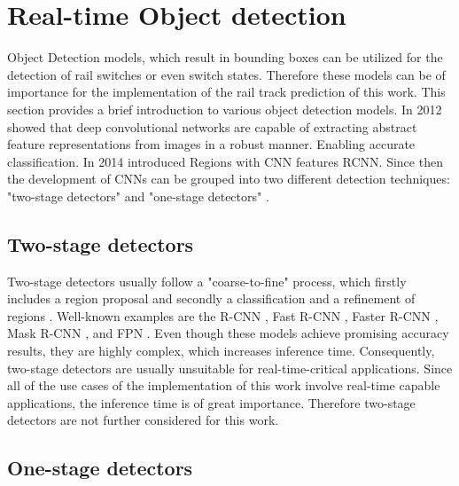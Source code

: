 \section{Real-time Object detection}
\label{sec:ObjectDetection}

Object Detection models, which result in bounding boxes can be utilized for the detection of rail switches or even switch states.
Therefore these models can be of importance for the implementation of the rail track prediction of this work.
This section provides a brief introduction to various object detection models.
In 2012 \cite{ImageNetClassification2012} showed that deep convolutional networks are capable of extracting abstract feature representations from images in a robust manner.
Enabling accurate classification.
In 2014 \cite{RCNN2014} introduced Regions with CNN features \ac{RCNN}.
Since then the development of CNNs can be grouped into two different detection techniques: "two-stage detectors" and "one-stage detectors" \cite{20yearsSurvey} \cite{surveyObjectDetection} \cite{surveyObjectDetection2019}.

\subsection{Two-stage detectors}

Two-stage detectors usually follow a "coarse-to-fine" process, which firstly includes a region proposal and secondly a classification and a refinement of regions \cite{20yearsSurvey} \cite{surveyObjectDetection} \cite{surveyObjectDetection2019} \cite{twostageObjectDetection}.
Well-known examples are the R-CNN \cite{RCNN2014}, Fast R-CNN \cite{FastRCNN2015}, Faster R-CNN \cite{FasterRCNN2017}, Mask R-CNN \cite{MaskRCNN2017}, and \ac{FPN} \cite{FPN2017_two_stage-detector}.
Even though these models achieve promising accuracy results, they are highly complex, which increases inference time.
Consequently, two-stage detectors are usually unsuitable for real-time-critical applications.
Since all of the use cases of the implementation of this work involve real-time capable applications, the inference time is of great importance.
Therefore two-stage detectors are not further considered for this work.

\subsection{One-stage detectors}

